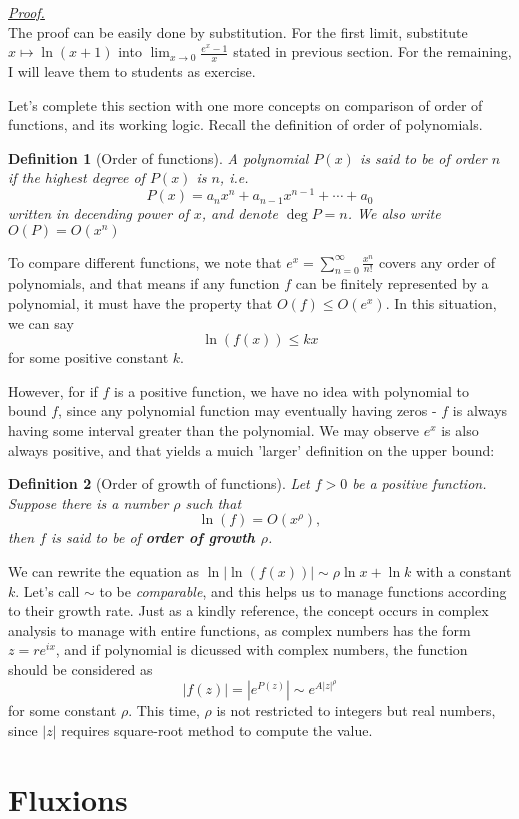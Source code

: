 \documentclass[12pt]{article}
\newtheorem{definition}{Definition}[section]
\renewenvironment{proof}[1][Proof]{\begin{snugshade*} \underline{\textit{{#1}.}}\\}{\hfill \qedsymbol \end{snugshade*}}
\begin{document}
    \begin{proof}
        The proof can be easily done by substitution. For the first limit, substitute $x\mapsto \ln(x+1)$ into $\displaystyle\lim_{x\to 0}\frac{e^x-1}{x}$ stated in previous section. For the remaining, I will leave them to students as exercise.
    \end{proof}

    Let's complete this section with one more concepts on comparison of order of functions, and its working logic. Recall the definition of order of polynomials.

    \begin{definition}[Order of functions]
        A polynomial $P(x)$ is said to be of order $n$ if the highest degree of $P(x)$ is $n$, i.e. \[P(x)=a_n x^n + a_{n-1} x^{n-1} + \cdots + a_0\] written in decending power of $x$, and denote $\deg{P}=n$. We also write $O(P)=O(x^n)$
    \end{definition}

    To compare different functions, we note that $e^x=\sum_{n=0}^{\infty}\frac{x^n}{n!}$ covers any order of polynomials, and that means if any function $f$ can be finitely represented by a polynomial, it must have the property that $O(f)\leq O(e^x)$. In this situation, we can say \[\ln(f(x))\leq kx\] for some positive constant $k$.

    However, for if $f$ is a positive function, we have no idea with polynomial to bound $f$, since any polynomial function may eventually having zeros - $f$ is always having some interval greater than the polynomial. We may observe $e^x$ is also always positive, and that yields a muich 'larger' definition on the upper bound:

    \begin{definition}[Order of growth of functions]
        Let $f>0$ be a positive function. Suppose there is a number $\rho$ such that \[\ln(f)=O(x^\rho),\] then $f$ is said to be of \textbf{order of growth $\rho$}.
    \end{definition}

    We can rewrite the equation as $\ln|\ln(f(x))|\sim\rho\ln{x}+\ln{k}$ with a constant $k$. Let's call $\sim$ to be \textit{comparable}, and this helps us to manage functions according to their growth rate. Just as a kindly reference, the concept occurs in complex analysis to manage with entire functions, as complex numbers has the form $z=re^{ix}$, and if polynomial is dicussed with complex numbers, the function should be considered as \[|f(z)|=|e^{P(z)}|\sim e^{A|z|^\rho}\] for some constant $\rho$. This time, $\rho$ is not restricted to integers but real numbers, since $|z|$ requires square-root method to compute the value.

    \section{Fluxions}
\end{document}

